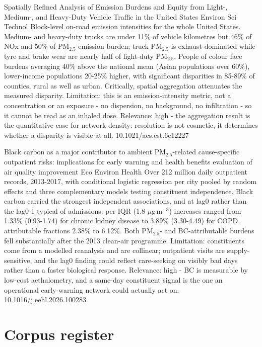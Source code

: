 \documentclass[10pt]{article}
\begin{document}
{Spatially Refined Analysis of Emission Burdens and Equity from Light-, Medium-, and Heavy-Duty Vehicle Traffic in the United States}
{Environ Sci Technol}
{Block-level on-road emission intensities for the whole United States. Medium- and heavy-duty trucks are under 11\% of vehicle kilometres but 46\% of NOx and 50\% of PM$_{2.5}$ emission burden; truck PM$_{2.5}$ is exhaust-dominated while tyre and brake wear are nearly half of light-duty PM$_{2.5}$. People of colour face burdens averaging 40\% above the national mean (Asian populations over 60\%), lower-income populations 20-25\% higher, with significant disparities in 85-89\% of counties, rural as well as urban. Critically, spatial aggregation attenuates the measured disparity. Limitation: this is an emission-intensity metric, not a concentration or an exposure - no dispersion, no background, no infiltration - so it cannot be read as an inhaled dose. Relevance: high - the aggregation result is the quantitative case for network density: resolution is not cosmetic, it determines whether a disparity is visible at all.}
{10.1021/acs.est.6c12227}

{Black carbon as a major contributor to ambient PM$_{2.5}$-related cause-specific outpatient risks: implications for early warning and health benefits evaluation of air quality improvement}
{Eco Environ Health}
{Over 212 million daily outpatient records, 2013-2017, with conditional logistic regression per city pooled by random effects and three complementary models testing constituent independence. Black carbon carried the strongest independent associations, and at lag0 rather than the lag0-1 typical of admissions: per IQR (1.8 $\mu$g\,m$^{-3}$) increases ranged from 1.33\% (0.93-1.74) for chronic kidney disease to 3.89\% (3.30-4.49) for COPD, attributable fractions 2.38\% to 6.12\%. Both PM$_{2.5}$- and BC-attributable burdens fell substantially after the 2013 clean-air programme. Limitation: constituents come from a modelled reanalysis and are collinear; outpatient visits are supply-sensitive, and the lag0 finding could reflect care-seeking on visibly bad days rather than a faster biological response. Relevance: high - BC is measurable by low-cost aethalometry, and a same-day constituent signal is the one an operational early-warning network could actually act on.}
{10.1016/j.eehl.2026.100283}

\clearpage
\section*{\sffamily\bfseries\color{Deep}Corpus register}
\vspace{-1.5mm}{\color{Amber}\rule{\linewidth}{1.1pt}}\vspace{2.5mm}
\end{document}
